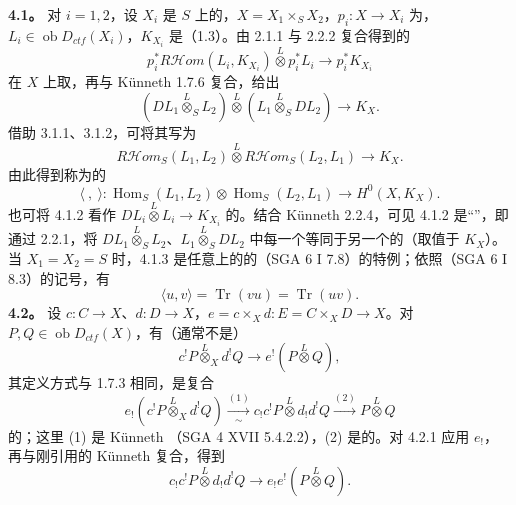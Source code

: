 \textbf{4.1。} 对 $i=1,2$，设 $X_i$ 是 $S$ 上的，$X=X_1\times_S X_2$，$p_i:X\to X_i$ 为，$L_i\in\operatorname{ob}D_{ctf}(X_i)$，$K_{X_i}$ 是（1.3）。由 2.1.1 与 2.2.2 复合得到的
\[p_i^*R\mathcal Hom(L_i,K_{X_i})\mathbin{\overset L\otimes}p_i^*L_i\longrightarrow p_i^*K_{X_i}\tag{4.1.1}\]
在 $X$ 上取，再与 Künneth  1.7.6 复合，给出
\[(DL_1\mathbin{\overset L\otimes}_S L_2)\mathbin{\overset L\otimes}(L_1\mathbin{\overset L\otimes}_S DL_2)\longrightarrow K_X.\tag{4.1.2}\]
借助 3.1.1、3.1.2，可将其写为
\[R\mathcal Hom_S(L_1,L_2)\mathbin{\overset L\otimes}R\mathcal Hom_S(L_2,L_1)\longrightarrow K_X.\tag{4.1.3}\]
由此得到称为的
\[\langle\ ,\ \rangle:\operatorname{Hom}_S(L_1,L_2)\otimes\operatorname{Hom}_S(L_2,L_1)\longrightarrow H^0(X,K_X).\tag{4.1.4}\]
也可将 4.1.2 看作 $DL_i\mathbin{\overset L\otimes}L_i\to K_{X_i}$ 的。结合 Künneth  2.2.4，可见 4.1.2 是“”，即通过 2.2.1，将 $DL_1\mathbin{\overset L\otimes}_S L_2$、$L_1\mathbin{\overset L\otimes}_S DL_2$ 中每一个等同于另一个的（取值于 $K_X$）。
当 $X_1=X_2=S$ 时，4.1.3 是任意上的的（SGA 6 I 7.8）的特例；依照（SGA 6 I 8.3）的记号，有
\[\langle u,v\rangle=\operatorname{Tr}(vu)=\operatorname{Tr}(uv).\tag{4.1.5}\]
\textbf{4.2。} 设 $c:C\to X$、$d:D\to X$，$e=c\times_Xd:E=C\times_XD\to X$。对 $P,Q\in\operatorname{ob}D_{ctf}(X)$，有（通常不是）
\[c^!P\mathbin{\overset L\otimes}_X d^!Q\longrightarrow e^!(P\mathbin{\overset L\otimes}Q),\tag{4.2.1}\]
其定义方式与 1.7.3 相同，是复合
\[e_!(c^!P\mathbin{\overset L\otimes}_Xd^!Q)\xrightarrow[\sim]{(1)}c_!c^!P\mathbin{\overset L\otimes}d_!d^!Q\xrightarrow{(2)}P\mathbin{\overset L\otimes}Q\]
的；这里 (1) 是 Künneth （SGA 4 XVII 5.4.2.2），(2) 是的。对 4.2.1 应用 $e_!$，再与刚引用的 Künneth 复合，得到
\[c_!c^!P\mathbin{\overset L\otimes}d_!d^!Q\longrightarrow e_!e^!(P\mathbin{\overset L\otimes}Q).\tag{4.2.2}\]
